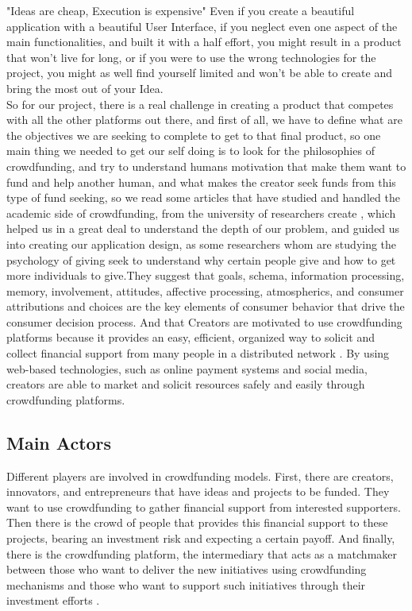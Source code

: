 "Ideas are cheap, Execution is expensive" Even if you create a beautiful application with a beautiful User Interface, if you neglect even one aspect of the main functionalities, and built it with a half effort, you might result in a product that won't live for long, or if you were to use the wrong technologies for the project, you might as well find yourself limited and won't be able to create and bring the most out of your Idea.\\

So for our project, there is a real challenge in creating a product that competes with all the other platforms out there,
and first of all, we have to define what are the objectives we are seeking to complete to get to that final product,
so one main thing we needed to get our self doing is to look for the philosophies of crowdfunding, and try to understand humans motivation that make them want to fund and help another human, and what makes the creator seek funds from this type of fund seeking,
so we read some articles that have studied and handled the academic side of crowdfunding, from the university of  researchers create \cite{inproceedings}, which helped us in a great deal to understand the depth of our problem, and guided us into creating our application design, as some researchers whom are studying the psychology of giving seek to understand why certain people give and how to get more individuals to give.They suggest that goals, schema, information processing, memory, involvement, attitudes, affective processing, atmospherics, and consumer attributions and choices are the key elements of consumer behavior that drive the consumer decision process.
And that Creators are motivated to use crowdfunding platforms because it provides an easy, efficient, organized way to solicit and collect financial support from many people in a distributed network \cite{crowdMotiv}. By using web-based technologies, such as online payment systems and social media, creators are able to market and solicit resources safely and easily through crowdfunding platforms.

\subsection{Main Actors}
Different players are involved in crowdfunding models. First, there are creators, innovators, and entrepreneurs that have ideas and
projects to be funded. They want to use crowdfunding to gather financial support from interested supporters.
Then there is the crowd of people that provides this financial support to these projects, bearing an investment
risk and expecting a certain payoff. And finally, there is the crowdfunding platform, the intermediary that acts
as a matchmaker between those who want to deliver the new initiatives using crowdfunding mechanisms
and those who want to support such initiatives through their investment efforts \cite{crwdfun:transform}.
